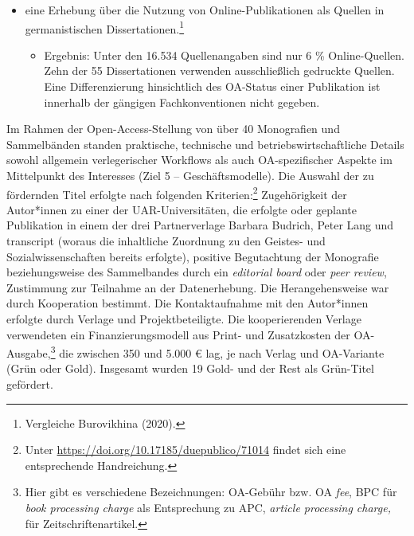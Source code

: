 \documentclass[a4paper,
fontsize=11pt,
oneside,
numbers=noperiodatend,
parskip=half-,
bibliography=totoc,
final
]{scrartcl}
\begin{document}
\begin{itemize}
  \begin{itemize}
  
  \item
    Ergebnis: Während innerhalb der Germanistik über 80 \% der Arbeiten
    im klassischen Verlagsmodell erschienen sind, setzten Soziolog*innen
    mit 51 \% zu einem deutlicheren Teil auf die
    Repositoriumspublikation.\footnote{Vergleiche
      \url{https://doi.org/10.17185/duepublico/71224} sowie
      \url{https://doi.org/10.17185/duepublico/71107}.}
  \end{itemize}
\item
  eine Erhebung über die Nutzung von Online-Publikationen als Quellen in
  germanistischen Dissertationen.\footnote{Vergleiche Burovikhina
    (2020).}

  \begin{itemize}
  
  \item
    Ergebnis: Unter den 16.534 Quellenangaben sind nur 6 \%
    Online-Quellen. Zehn der 55 Dissertationen verwenden ausschließlich
    gedruckte Quellen. Eine Differenzierung hinsichtlich des OA-Status
    einer Publikation ist innerhalb der gängigen Fachkonventionen nicht
    gegeben.
  \end{itemize}
\end{itemize}

Im Rahmen der Open-Access-Stellung von über 40 Monografien und
Sammelbänden standen praktische, technische und betriebswirtschaftliche
Details sowohl allgemein verlegerischer Workflows als auch
OA-spezifischer Aspekte im Mittelpunkt des Interesses (Ziel 5 --
Geschäftsmodelle). Die Auswahl der zu fördernden Titel erfolgte nach
folgenden Kriterien:\footnote{Unter
  \url{https://doi.org/10.17185/duepublico/71014} findet sich eine
  entsprechende Handreichung.} Zugehörigkeit der Autor*innen zu einer
der UAR-Universitäten, die erfolgte oder geplante Publikation in einem
der drei Partnerverlage Barbara Budrich, Peter Lang und transcript
(woraus die inhaltliche Zuordnung zu den Geistes- und
Sozialwissenschaften bereits erfolgte), positive Begutachtung der
Monografie beziehungsweise des Sammelbandes durch ein \emph{editorial
board} oder \emph{peer review}, Zustimmung zur Teilnahme an der
Datenerhebung. Die Herangehensweise war durch Kooperation bestimmt. Die
Kontaktaufnahme mit den Autor*innen erfolgte durch Verlage und
Projektbeteiligte. Die kooperierenden Verlage verwendeten ein
Finanzierungsmodell aus Print- und Zusatzkosten der
OA-Ausgabe,\footnote{Hier gibt es verschiedene Bezeichnungen: OA-Gebühr
  bzw. OA \emph{fee}, BPC für \emph{book processing charge} als
  Entsprechung zu APC, \emph{article processing charge,} für
  Zeitschriftenartikel.} die zwischen 350 und 5.000 € lag, je nach
Verlag und OA-Variante (Grün oder Gold). Insgesamt wurden 19 Gold- und
der Rest als Grün-Titel gefördert.
\end{document}
